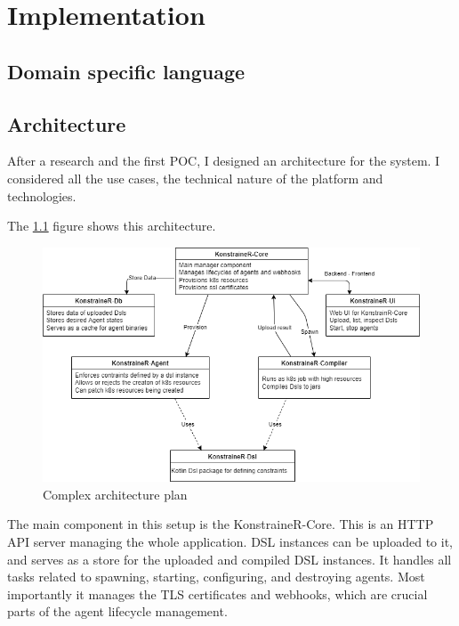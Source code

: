 \setlength{\parindent}{0pt}
\setlength{\parskip}{0.6em}

\chapter{Implementation}
\label{chap:archPlan}

\section{Domain specific language}

\section{Architecture}

After a research and the first POC, I designed an architecture for the system. I considered all the use cases, the technical nature of the platform and technologies.

The \ref{fig:comp_arch} figure shows this architecture.

\begin{figure}[h]
    \centering
    \includegraphics[width=130mm, keepaspectratio]{content/75_archPlan/xarch.png}
    \caption{Complex architecture plan}
    \label{fig:comp_arch}
\end{figure}


The main component in this setup is the KonstraineR-Core. This is an HTTP API server managing the whole application. DSL instances can be uploaded to it, and serves as a store for the uploaded and compiled DSL instances. It handles all tasks related to spawning, starting, configuring, and destroying agents. Most importantly it manages the TLS certificates and webhooks, which are crucial parts of the agent lifecycle management.

